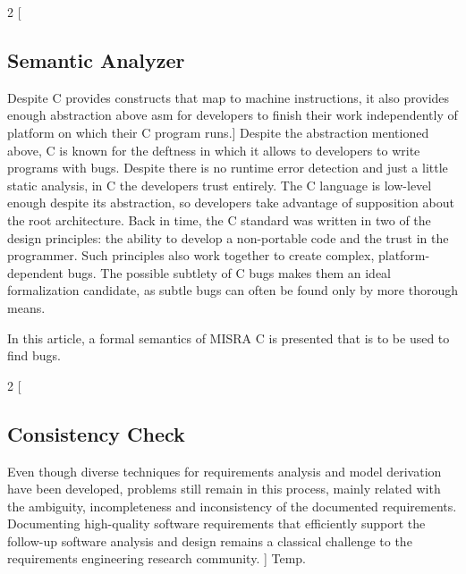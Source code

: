 \begin{minipage}{\linewidth}
	\begin{multicols*}{2}
		[
		\vspace{6 mm}
		\subsection{Semantic Analyzer}
		Despite C provides constructs that map to machine instructions, it also provides enough abstraction above \gls{asm} for developers to finish their work independently of platform  on which their C program runs.]
		Despite the abstraction mentioned above, C is known for the deftness in which it allows to developers to write programs with bugs. Despite there is no runtime error detection and just a little static analysis, in C the developers trust entirely. The C language is low-level enough despite its abstraction, so developers take advantage of supposition about the root architecture.  
		Back in time, the C standard was written in two of the design principles: the ability to develop a non-portable code and the trust in the programmer\cite{AmericanNationalStandardsInstitute:1990:RAC:533966}. Such principles also work together to create complex, platform-dependent bugs. The possible subtlety of C bugs makes them an ideal formalization candidate, as subtle bugs can often be found only by more thorough means.
		
		In this article, a formal semantics of MISRA C is presented that is to be used to find bugs. 
	\end{multicols*}
\end{minipage}

\begin{minipage}{\linewidth}
	\begin{multicols*}{2}
		[
		\vspace{6 mm}
		\subsection{Consistency Check}
		Even though diverse techniques for
		requirements analysis and model derivation have been developed, problems still remain in this process, mainly related with the ambiguity, incompleteness and inconsistency of the documented requirements. Documenting high-quality software requirements that efficiently support the follow-up software analysis and design remains a classical challenge to the requirements engineering research community. ]
		Temp.
	\end{multicols*}
\end{minipage}

